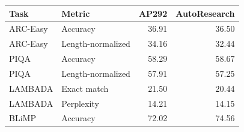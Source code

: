 \begin{tabular}{llrr}
\toprule
Task & Metric & AP292 & AutoResearch \\
\midrule
ARC-Easy & Accuracy & 36.91 & 36.50 \\
ARC-Easy & Length-normalized & 34.16 & 32.44 \\
PIQA & Accuracy & 58.29 & 58.67 \\
PIQA & Length-normalized & 57.91 & 57.25 \\
LAMBADA & Exact match & 21.50 & 20.44 \\
LAMBADA & Perplexity & 14.21 & 14.15 \\
BLiMP & Accuracy & 72.02 & 74.56 \\
\bottomrule
\end{tabular}
